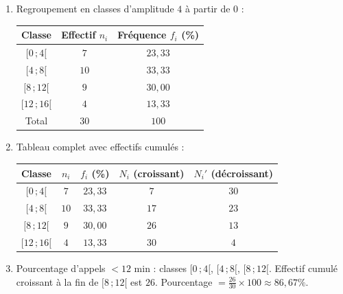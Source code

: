 \documentclass[11pt]{article}
\begin{document}
\begin{corrige}
\begin{enumerate}
\item Regroupement en classes d'amplitude $4$ à partir de $0$ :
\begin{center}
\begin{tabular}{|c|c|c|}
\hline
Classe & Effectif $n_i$ & Fréquence $f_i$ (\%)\\
\hline
$[0\,; 4[$ & $7$ & $23,33$ \\
$[4\,; 8[$ & $10$ & $33,33$ \\
$[8\,; 12[$ & $9$ & $30,00$ \\
$[12\,; 16[$ & $4$ & $13,33$ \\
\hline
Total & $30$ & $100$ \\
\hline
\end{tabular}
\end{center}
\item Tableau complet avec effectifs cumulés :
\begin{center}
\begin{tabular}{|c|c|c|c|c|}
\hline
Classe & $n_i$ & $f_i$ (\%) & $N_i$ (croissant) & $N_i'$ (décroissant) \\
\hline
$[0\,; 4[$ & $7$ & $23,33$ & $7$ & $30$ \\
$[4\,; 8[$ & $10$ & $33,33$ & $17$ & $23$ \\
$[8\,; 12[$ & $9$ & $30,00$ & $26$ & $13$ \\
$[12\,; 16[$ & $4$ & $13,33$ & $30$ & $4$ \\
\hline
\end{tabular}
\end{center}
\item Pourcentage d'appels $< 12$ min : classes $[0\,;4[$, $[4\,;8[$, $[8\,;12[$. Effectif cumulé croissant à la fin de $[8\,;12[$ est $26$. Pourcentage $= \frac{26}{30}\times100 \approx 86,67\%$.
\end{enumerate}
\end{corrige}
\end{document}
